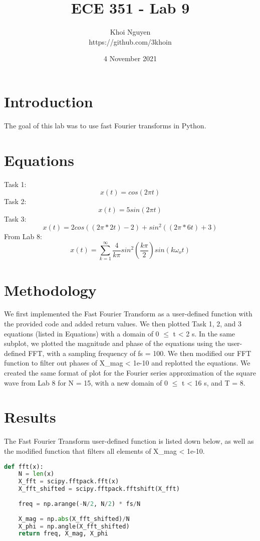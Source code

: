 \documentclass[11pt,a4,titlepage]{article}
\title{ECE 351 - Lab 9}
\author{Khoi Nguyen \\ https://github.com/3khoin}
\date{4 November 2021}
\begin{document}
\maketitle
\pagebreak

\tableofcontents
\pagebreak

\section{Introduction}
The goal of this lab was to use fast Fourier transforms in Python.

\section{Equations}
Task 1:
\[x(t) = cos(2\pi t)\]
Task 2:
\[x(t) = 5sin(2\pi t)\]
Task 3:
\[x(t) = 2cos((2\pi * 2t) - 2) + sin^{2}((2\pi * 6t) + 3)\]
From Lab 8:
\[x(t) = \sum_{k=1}^{\infty} \frac{4}{k\pi}sin^2(\frac{k\pi}{2})sin(k\omega_{o}t)\]

\section{Methodology}
We first implemented the Fast Fourier Transform as a user-defined function with the provided code and added return values. We then plotted Task 1, 2, and 3 equations (listed in Equations) with a domain of 0 $\leq$ t < 2 s. In the same subplot, we plotted the magnitude and phase of the equations using the user-defined FFT, with a sampling frequency of fs = 100. We then modified our FFT function to filter out phases of X\_mag < 1e-10 and replotted the equations. We created the same format of plot for the Fourier series approximation of the square wave from Lab 8 for N = 15, with a new domain of 0 $\leq$ t < 16 s, and T = 8.

\section{Results}
The Fast Fourier Transform user-defined function is listed down below, as well as the modified function that filters all elements of X\_mag < 1e-10.

\begin{lstlisting}[language=Python]
def fft(x):
	N = len(x)
	X_fft = scipy.fftpack.fft(x)
	X_fft_shifted = scipy.fftpack.fftshift(X_fft)
	
	freq = np.arange(-N/2, N/2) * fs/N
	
	X_mag = np.abs(X_fft_shifted)/N
	X_phi = np.angle(X_fft_shifted)
	return freq, X_mag, X_phi
\end{lstlisting}
\end{document}
